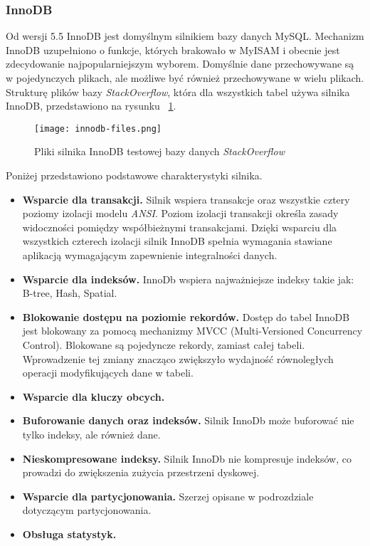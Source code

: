 \subsubsection{InnoDB}
Od wersji 5.5 InnoDB jest domyślnym silnikiem bazy danych MySQL. Mechanizm InnoDB uzupełniono o funkcje, których brakowało w MyISAM i obecnie jest zdecydowanie najpopularniejszym wyborem. Domyślnie dane przechowywane są w pojedynczych plikach, ale możliwe być również przechowywane w wielu plikach. Strukturę plików bazy \textit{StackOverflow}, która dla wszystkich tabel używa silnika InnoDB, przedstawiono na rysunku ~\ref{fig:innodb-fileslabel}.
\begin{figure}[!h]
	\centering
	\texttt{[image: innodb-files.png]}
	\caption{Pliki silnika InnoDB testowej bazy danych \textit{StackOverflow}}
	\label{fig:innodb-fileslabel}
\end{figure}
Poniżej przedstawiono podstawowe charakterystyki silnika.
\begin{itemize}
	\item \textbf{Wsparcie dla transakcji.} Silnik wspiera transakcje oraz wszystkie cztery poziomy izolacji modelu \textit{ANSI}. Poziom izolacji transakcji określa zasady widoczności pomiędzy współbieżnymi transakcjami. Dzięki wsparciu dla wszystkich czterech izolacji  silnik InnoDB spełnia wymagania stawiane aplikacją wymagającym zapewnienie integralności danych. 
	\item \textbf{Wsparcie dla indeksów.} InnoDb wspiera najważniejsze indeksy takie jak: B-tree, Hash, Spatial.
	\item \textbf{Blokowanie dostępu na poziomie rekordów. } Dostęp do tabel InnoDB jest blokowany za pomocą mechanizmy MVCC (Multi-Versioned Concurrency Control). Blokowane są pojedyncze rekordy, zamiast całej tabeli. Wprowadzenie tej zmiany znacząco zwiększyło wydajność równoległych operacji modyfikujących dane w tabeli.
	\item \textbf{Wsparcie dla kluczy obcych.}
	\item \textbf{Buforowanie danych oraz indeksów.} Silnik InnoDb może buforować nie tylko indeksy, ale również dane.
	\item  \textbf{Nieskompresowane indeksy.} Silnik InnoDb nie kompresuje indeksów, co prowadzi do zwiększenia zużycia przestrzeni dyskowej.
	\item \textbf{Wsparcie dla partycjonowania.} Szerzej opisane w podrozdziale dotyczącym partycjonowania.
	\item \textbf{Obsługa statystyk.}
\end{itemize}

